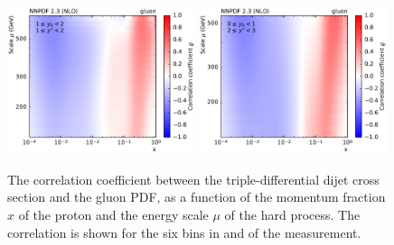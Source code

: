 \begin{figure}[htbp]
    \includegraphics[width=0.49\textwidth]{figures/pdf_constraints/corr_PTMAXEXPYS_YBYS_NLO_FINALBINS_NNPDF23_gluon_ys1_0yb1_0_cl.pdf}\hfill
    \includegraphics[width=0.49\textwidth]{figures/pdf_constraints/corr_PTMAXEXPYS_YBYS_NLO_FINALBINS_NNPDF23_gluon_ys2_0yb0_0_cl.pdf}\hfill
    \caption[Correlation between dijet cross section and gluon PDF]{
            The correlation coefficient between the triple-differential dijet cross
            section and the gluon PDF, as a function of the momentum fraction $x$ of the
            proton and the energy scale $\mu$ of the hard process. The correlation is shown
            for the six bins in \ystar and \yboost of the measurement.}
    \label{fig:pdfconstraints_gluon}
\end{figure}

